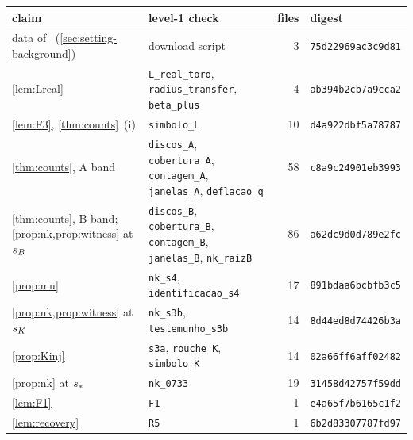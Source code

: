 \begin{tabular}{@{}p{}p{}rl@{}}
\toprule
claim & level-1 check & files & digest \\
\midrule
data of~\cite{RT2019} (\cref{sec:setting-background}) & download script & 3 & \texttt{75d22969ac3c9d81} \\
\cref{lem:Lreal} & \texttt{L\_real\_toro}, \texttt{radius\_transfer}, \texttt{beta\_plus} & 4 & \texttt{ab394b2cb7a9cca2} \\
\cref{lem:F3}, \cref{thm:counts}~(i) & \texttt{simbolo\_L} & 10 & \texttt{d4a922dbf5a78787} \\
\cref{thm:counts}, A band & \texttt{discos\_A}, \texttt{cobertura\_A}, \texttt{contagem\_A}, \texttt{janelas\_A}, \texttt{deflacao\_q} & 58 & \texttt{c8a9c24901eb3993} \\
\cref{thm:counts}, B band; \cref{prop:nk,prop:witness} at $s_{B}$ & \texttt{discos\_B}, \texttt{cobertura\_B}, \texttt{contagem\_B}, \texttt{janelas\_B}, \texttt{nk\_raizB} & 86 & \texttt{a62dc9d0d789e2fc} \\
\cref{prop:mu} & \texttt{nk\_s4}, \texttt{identificacao\_s4} & 17 & \texttt{891bdaa6bcbfb3c5} \\
\cref{prop:nk,prop:witness} at $s_{K}$ & \texttt{nk\_s3b}, \texttt{testemunho\_s3b} & 14 & \texttt{8d44ed8d74426b3a} \\
\cref{prop:Kinj} & \texttt{s3a}, \texttt{rouche\_K}, \texttt{simbolo\_K} & 14 & \texttt{02a66ff6aff02482} \\
\cref{prop:nk} at $s_{\ast}$ & \texttt{nk\_0733} & 19 & \texttt{31458d42757f59dd} \\
\cref{lem:F1} & \texttt{F1} & 1 & \texttt{e4a65f7b6165c1f2} \\
\cref{lem:recovery} & \texttt{R5} & 1 & \texttt{6b2d83307787fd97} \\
\bottomrule
\end{tabular}
